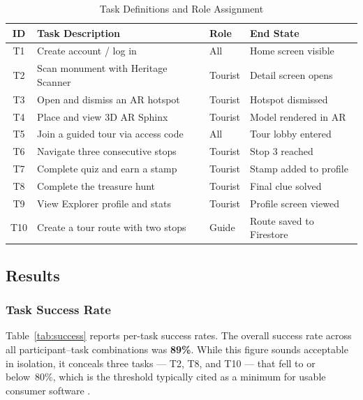 \begin{table}[htbp]
  \centering
  \caption{Task Definitions and Role Assignment}
  \label{tab:tasks}
  \begin{tabular}{clll}
    \toprule
    \textbf{ID} & \textbf{Task Description} & \textbf{Role} & \textbf{End State} \\
    \midrule
    T1  & Create account / log in            & All     & Home screen visible \\
    T2  & Scan monument with Heritage Scanner & Tourist & Detail screen opens \\
    T3  & Open and dismiss an AR hotspot      & Tourist & Hotspot dismissed \\
    T4  & Place and view 3D AR Sphinx         & Tourist & Model rendered in AR \\
    T5  & Join a guided tour via access code  & All     & Tour lobby entered \\
    T6  & Navigate three consecutive stops    & Tourist & Stop 3 reached \\
    T7  & Complete quiz and earn a stamp      & Tourist & Stamp added to profile \\
    T8  & Complete the treasure hunt          & Tourist & Final clue solved \\
    T9  & View Explorer profile and stats     & Tourist & Profile screen viewed \\
    T10 & Create a tour route with two stops  & Guide   & Route saved to Firestore \\
    \bottomrule
  \end{tabular}
\end{table}

\subsection{Results}
\label{sec:results-data}

\subsubsection{Task Success Rate}

Table~\ref{tab:success} reports per-task success rates. The overall success rate across
all participant--task combinations was \textbf{89\%}. While this figure sounds
acceptable in isolation, it conceals three tasks — T2, T8, and T10 — that fell to or
below~80\%, which is the threshold typically cited as a minimum for usable consumer
software \citep{nielsen1993}.

